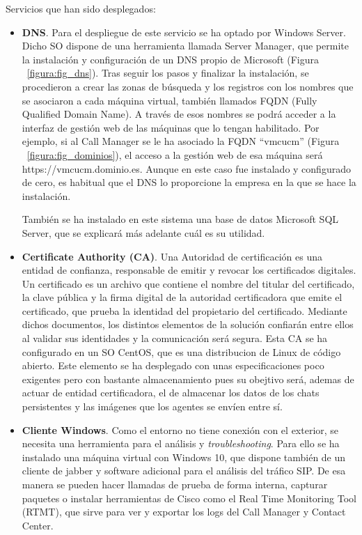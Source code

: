 \documentclass[a4paper, 12pt]{book}
\begin{document}
Servicios que han sido desplegados:
\begin{itemize}
  \item \textbf{DNS}. Para el despliegue de este servicio se ha optado por Windows Server. Dicho SO dispone de una herramienta llamada Server Manager, que permite la instalación y configuración de un DNS propio de Microsoft (Figura ~\ref{figura:fig_dns}). Tras seguir los pasos y finalizar la instalación, se procedieron a crear las zonas de búsqueda y los registros con los nombres que se asociaron a cada máquina virtual, también llamados FQDN (Fully Qualified Domain Name). A través de esos nombres se podrá acceder a la interfaz de gestión web de las máquinas que lo tengan habilitado. Por ejemplo, si al Call Manager se le ha asociado la FQDN ``vmcucm'' (Figura ~\ref{figura:fig_dominios}), el acceso a la gestión web de esa máquina será https://vmcucm.dominio.es. Aunque en este caso fue instalado y configurado de cero, es habitual que el DNS lo proporcione la empresa en la que se hace la instalación.
  
  También se ha instalado en este sistema una base de datos Microsoft SQL Server, que se explicará más adelante cuál es su utilidad.

  \item \textbf{Certificate Authority (CA)}. Una Autoridad de certificación es una entidad de confianza, responsable de emitir y revocar los certificados digitales. Un certificado es un archivo que contiene el nombre del titular del certificado, la clave pública y la firma digital de la autoridad certificadora que emite el certificado, que prueba la identidad del propietario del certificado. 
  Mediante dichos documentos, los distintos elementos de la solución confiarán entre ellos al validar sus identidades y la comunicación será segura.
  Esta CA se ha configurado en un SO CentOS, que es una distribucion de Linux de código abierto.
  Este elemento se ha desplegado con unas especificaciones poco exigentes pero con bastante almacenamiento pues su obejtivo será, ademas de actuar de entidad certificadora, el de almacenar los datos de los chats persistentes y las imágenes que los agentes se envíen entre sí.

  \item \textbf{Cliente Windows}. Como el entorno no tiene conexión con el exterior, se necesita una herramienta para el análisis y \emph{troubleshooting}. Para ello se ha instalado una máquina virtual con Windows 10, que dispone también de un cliente de jabber y software adicional para el análisis del tráfico SIP. De esa manera se pueden hacer llamadas de prueba de forma interna, capturar paquetes o instalar herramientas de Cisco como el Real Time Monitoring Tool (RTMT), que sirve para ver y exportar los logs del Call Manager y Contact Center.
\end{itemize}
\end{document}
